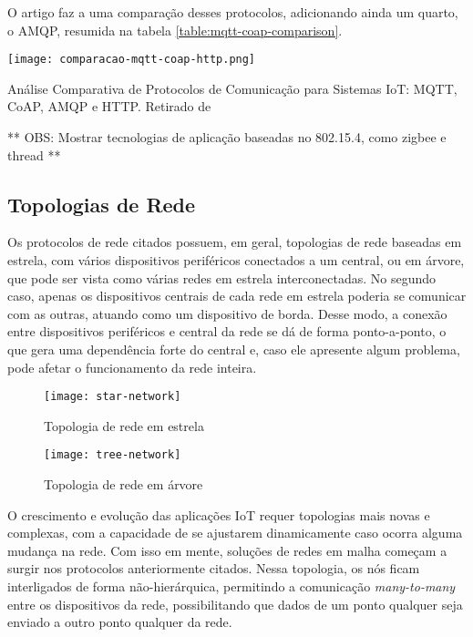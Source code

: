 \documentclass[../monografia.tex]{subfiles}
\begin{document}
O artigo \cite{mqtt-coap-comparison} faz a uma comparação desses protocolos, adicionando ainda um quarto, o AMQP, resumida na tabela \ref{table:mqtt-coap-comparison}.

\begin{table}[h]
\centering
\texttt{[image: comparacao-mqtt-coap-http.png]}
\caption{Análise Comparativa de Protocolos de Comunicação para Sistemas IoT: MQTT, CoAP, AMQP e HTTP. Retirado de \cite{mqtt-coap-comparison}}
\label{table:mqtt-coap-comparison}
\end{table}


** OBS: Mostrar tecnologias de aplicação baseadas no 802.15.4, como zigbee e thread **
 
\subsection{Topologias de Rede} \label{topologias-rede}

Os protocolos de rede citados possuem, em geral, topologias de rede baseadas em estrela, com vários dispositivos periféricos conectados a um central, ou em árvore, que pode ser vista como várias redes em estrela interconectadas. No segundo caso, apenas os dispositivos centrais de cada rede em estrela poderia se comunicar com as outras, atuando como um dispositivo de borda. Desse modo, a conexão entre dispositivos periféricos e central da rede se dá de forma ponto-a-ponto, o que gera uma dependência forte do central e, caso ele apresente algum problema, pode afetar o funcionamento da rede inteira.

\begin{figure}[h!]
\centering
\begin{minipage}{.5\textwidth}
	\centering	
	\texttt{[image: star-network]}
	\caption{Topologia de rede em estrela}
	\label{fig:Rede em estrela}
\end{minipage}%
\begin{minipage}{.5\textwidth}
	\centering
	\texttt{[image: tree-network]}
	\caption{Topologia de rede em árvore}
	\label{fig:Rede em árvore}
\end{minipage}

\end{figure}


O crescimento e evolução das aplicações IoT requer topologias mais novas e complexas, com a capacidade de se ajustarem dinamicamente caso ocorra alguma mudança na rede. Com isso em mente, soluções de redes em malha começam a surgir nos protocolos anteriormente citados. Nessa topologia, os nós ficam interligados de forma não-hierárquica, permitindo a comunicação \textit{many-to-many} entre os dispositivos da rede, possibilitando que dados de um ponto qualquer seja enviado a outro ponto qualquer da rede. 
\end{document}
